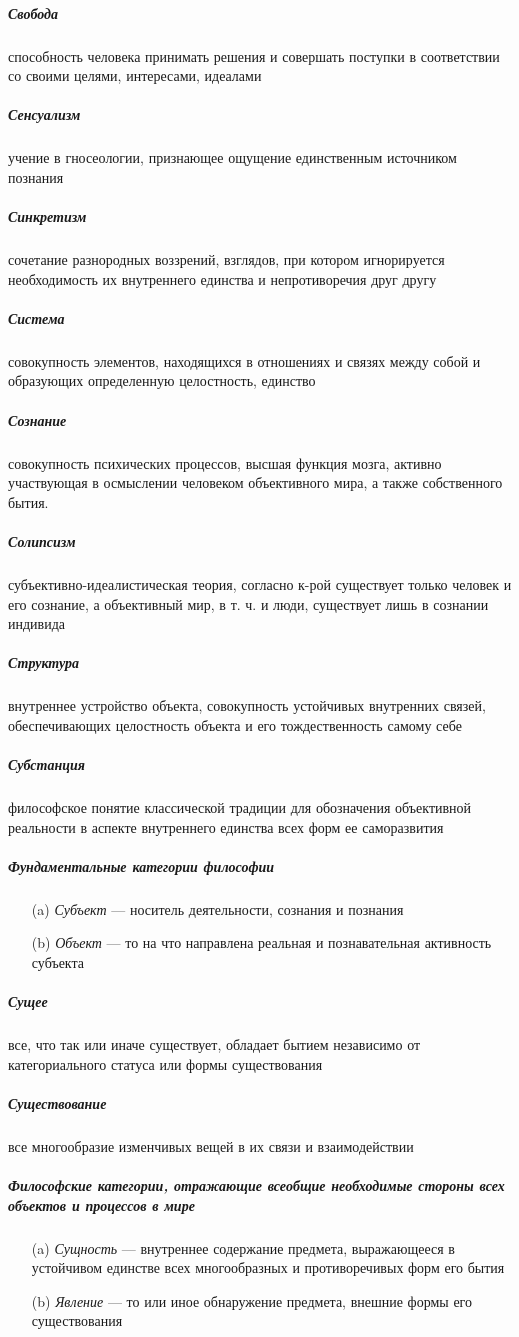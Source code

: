 \documentclass[a4paper, 12pt]{article}
\theoremstyle{plain} %
\theoremstyle{definition} %
\theoremstyle{remark} %
\begin{document}
\subparagraph{Свобода}
	 способность человека принимать решения и совершать поступки в соответствии со своими целями, интересами, идеалами

\subparagraph{Сенсуализм}
	 учение в гносеологии, признающее ощущение единственным источником познания

\subparagraph{Синкретизм}
	сочетание разнородных воззрений, взглядов, при котором игнорируется необходимость их внутреннего единства и непротиворечия друг другу

\subparagraph{Система}
	совокупность элементов, находящихся в отношениях и связях между собой и образующих определенную целостность, единство

\subparagraph{Сознание}
	совокупность психических процессов, высшая функция мозга, активно участвующая в осмыслении человеком объективного мира, а также собственного бытия.

\subparagraph{Солипсизм}
	субъективно-идеалистическая теория, согласно к-рой существует только человек и его сознание, а объективный мир, в т. ч. и люди, существует лишь в сознании индивида

\subparagraph{Структура}
	внутреннее устройство объекта, совокупность устойчивых внутренних связей, обеспечивающих целостность объекта и его тождественность самому себе

\subparagraph{Субстанция}
	философское понятие классической традиции для обозначения объективной реальности в аспекте внутреннего единства всех форм ее саморазвития

\subparagraph{Фундаментальные категории философии}
\begin{itemize}
	\item[(a)] \emph{Субъект} --- носитель деятельности, сознания и познания
	\item[(b)] \emph{Объект} --- то на что направлена реальная и познавательная активность субъекта
\end{itemize}

\subparagraph{Сущее}
	все, что так или иначе существует, обладает бытием независимо от категориального статуса или формы существования

\subparagraph{Существование}
	все многообразие изменчивых вещей в их связи и взаимодействии

\subparagraph{Философские категории, отражающие всеобщие необходимые стороны всех объектов и процессов в мире}
\begin{itemize}
	\item[(a)] \emph{Сущность} --- внутреннее содержание предмета, выражающееся в устойчивом единстве всех многообразных и противоречивых форм его бытия
	\item[(b)] \emph{Явление} --- то или иное обнаружение предмета, внешние формы его существования
\end{itemize}
\end{document}
